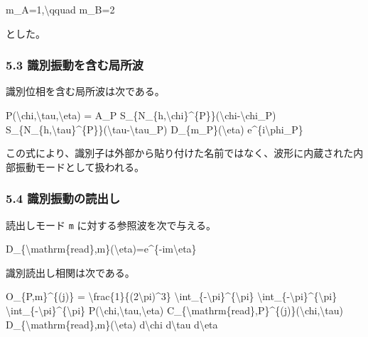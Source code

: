 \documentclass[
  a4paper,
]{article}
\newenvironment{Shaded}{}{}
\newcommand{\NormalTok}[1]{#1}
\begin{document}
\begin{Shaded}
\begin{Highlighting}[]
\NormalTok{m\_A=1,\textbackslash{}qquad m\_B=2}
\end{Highlighting}
\end{Shaded}

とした。

\subsubsection{5.3
識別振動を含む局所波}\label{ux8b58ux5225ux632fux52d5ux3092ux542bux3080ux5c40ux6240ux6ce2}

識別位相を含む局所波は次である。

\begin{Shaded}
\begin{Highlighting}[]
\NormalTok{P(\textbackslash{}chi,\textbackslash{}tau,\textbackslash{}eta)}
\NormalTok{=}
\NormalTok{A\_P}
\NormalTok{S\_\{N\_\{h,\textbackslash{}chi\}\^{}\{P\}\}(\textbackslash{}chi{-}\textbackslash{}chi\_P)}
\NormalTok{S\_\{N\_\{h,\textbackslash{}tau\}\^{}\{P\}\}(\textbackslash{}tau{-}\textbackslash{}tau\_P)}
\NormalTok{D\_\{m\_P\}(\textbackslash{}eta)}
\NormalTok{e\^{}\{i\textbackslash{}phi\_P\}}
\end{Highlighting}
\end{Shaded}

この式により、識別子は外部から貼り付けた名前ではなく、波形に内蔵された内部振動モードとして扱われる。

\subsubsection{5.4
識別振動の読出し}\label{ux8b58ux5225ux632fux52d5ux306eux8aadux51faux3057}

読出しモード \texttt{m} に対する参照波を次で与える。

\begin{Shaded}
\begin{Highlighting}[]
\NormalTok{D\_\{\textbackslash{}mathrm\{read\},m\}(\textbackslash{}eta)=e\^{}\{{-}im\textbackslash{}eta\}}
\end{Highlighting}
\end{Shaded}

識別読出し相関は次である。

\begin{Shaded}
\begin{Highlighting}[]
\NormalTok{O\_\{P,m\}\^{}\{(j)\}}
\NormalTok{=}
\NormalTok{\textbackslash{}frac\{1\}\{(2\textbackslash{}pi)\^{}3\}}
\NormalTok{\textbackslash{}int\_\{{-}\textbackslash{}pi\}\^{}\{\textbackslash{}pi\}}
\NormalTok{\textbackslash{}int\_\{{-}\textbackslash{}pi\}\^{}\{\textbackslash{}pi\}}
\NormalTok{\textbackslash{}int\_\{{-}\textbackslash{}pi\}\^{}\{\textbackslash{}pi\}}
\NormalTok{P(\textbackslash{}chi,\textbackslash{}tau,\textbackslash{}eta)}
\NormalTok{C\_\{\textbackslash{}mathrm\{read\},P\}\^{}\{(j)\}(\textbackslash{}chi,\textbackslash{}tau)}
\NormalTok{D\_\{\textbackslash{}mathrm\{read\},m\}(\textbackslash{}eta)}
\NormalTok{d\textbackslash{}chi d\textbackslash{}tau d\textbackslash{}eta}
\end{Highlighting}
\end{Shaded}
\end{document}
